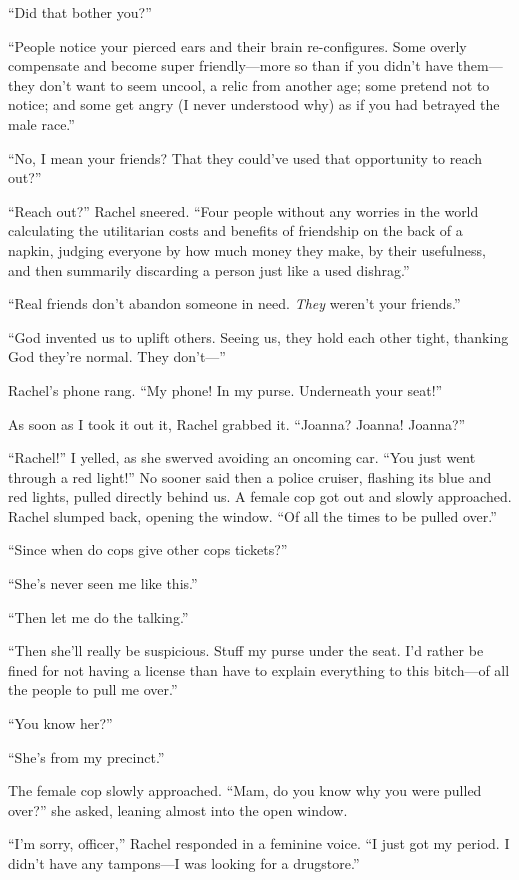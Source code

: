 ``Did that bother you?''

``People notice your pierced ears and their brain re-configures. Some
overly compensate and become super friendly---more so than if you didn't
have them---they don't want to seem uncool, a relic from another age;
some pretend not to notice; and some get angry (I never understood why)
as if you had betrayed the male race.''

``No, I mean your friends? That they could've used that opportunity to
reach out?''

``Reach out?'' Rachel sneered. ``Four people without any worries in the
world calculating the utilitarian costs and benefits of friendship on
the back of a napkin, judging everyone by how much money they make, by
their usefulness, and then summarily discarding a person just like a
used dishrag.''

``Real friends don't abandon someone in need. \emph{They} weren't your
friends.''

``God invented us to uplift others. Seeing us, they hold each other
tight, thanking God they're normal. They don't---''

Rachel's phone rang. ``My phone! In my purse. Underneath your seat!''

As soon as I took it out it, Rachel grabbed it. ``Joanna? Joanna!
Joanna?''

``Rachel!'' I yelled, as she swerved avoiding an oncoming car. ``You
just went through a red light!'' No sooner said then a police cruiser,
flashing its blue and red lights, pulled directly behind us. A female
cop got out and slowly approached. Rachel slumped back, opening the
window. ``Of all the times to be pulled over.''

``Since when do cops give other cops tickets?''

``She's never seen me like this.''

``Then let me do the talking.''

``Then she'll really be suspicious. Stuff my purse under the seat. I'd
rather be fined for not having a license than have to explain everything
to this bitch---of all the people to pull me over.''

``You know her?''

``She's from my precinct.''

The female cop slowly approached. ``Mam, do you know why you were pulled
over?'' she asked, leaning almost into the open window.

``I'm sorry, officer,'' Rachel responded in a feminine voice. ``I just
got my period. I didn't have any tampons---I was looking for a
drugstore.''

